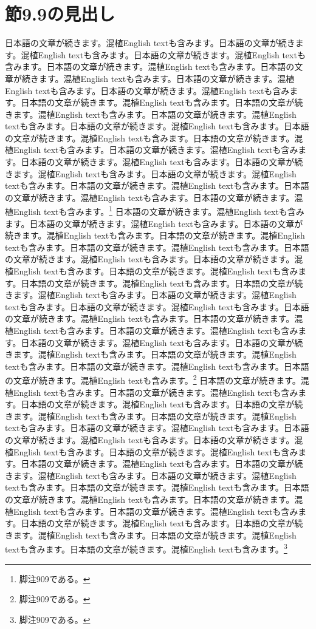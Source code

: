 \documentclass[pdflatex,book]{jlreq}
\begin{document}
\section{節9.9の見出し}
日本語の文章が続きます。混植English textも含みます。日本語の文章が続きます。混植English textも含みます。日本語の文章が続きます。混植English textも含みます。日本語の文章が続きます。混植English textも含みます。日本語の文章が続きます。混植English textも含みます。日本語の文章が続きます。混植English textも含みます。日本語の文章が続きます。混植English textも含みます。日本語の文章が続きます。混植English textも含みます。日本語の文章が続きます。混植English textも含みます。日本語の文章が続きます。混植English textも含みます。日本語の文章が続きます。混植English textも含みます。日本語の文章が続きます。混植English textも含みます。日本語の文章が続きます。混植English textも含みます。日本語の文章が続きます。混植English textも含みます。日本語の文章が続きます。混植English textも含みます。日本語の文章が続きます。混植English textも含みます。日本語の文章が続きます。混植English textも含みます。日本語の文章が続きます。混植English textも含みます。日本語の文章が続きます。混植English textも含みます。日本語の文章が続きます。混植English textも含みます。\footnote{脚注909である。}
日本語の文章が続きます。混植English textも含みます。日本語の文章が続きます。混植English textも含みます。日本語の文章が続きます。混植English textも含みます。日本語の文章が続きます。混植English textも含みます。日本語の文章が続きます。混植English textも含みます。日本語の文章が続きます。混植English textも含みます。日本語の文章が続きます。混植English textも含みます。日本語の文章が続きます。混植English textも含みます。日本語の文章が続きます。混植English textも含みます。日本語の文章が続きます。混植English textも含みます。日本語の文章が続きます。混植English textも含みます。日本語の文章が続きます。混植English textも含みます。日本語の文章が続きます。混植English textも含みます。日本語の文章が続きます。混植English textも含みます。日本語の文章が続きます。混植English textも含みます。日本語の文章が続きます。混植English textも含みます。日本語の文章が続きます。混植English textも含みます。日本語の文章が続きます。混植English textも含みます。日本語の文章が続きます。混植English textも含みます。日本語の文章が続きます。混植English textも含みます。\footnote{脚注909である。}
日本語の文章が続きます。混植English textも含みます。日本語の文章が続きます。混植English textも含みます。日本語の文章が続きます。混植English textも含みます。日本語の文章が続きます。混植English textも含みます。日本語の文章が続きます。混植English textも含みます。日本語の文章が続きます。混植English textも含みます。日本語の文章が続きます。混植English textも含みます。日本語の文章が続きます。混植English textも含みます。日本語の文章が続きます。混植English textも含みます。日本語の文章が続きます。混植English textも含みます。日本語の文章が続きます。混植English textも含みます。日本語の文章が続きます。混植English textも含みます。日本語の文章が続きます。混植English textも含みます。日本語の文章が続きます。混植English textも含みます。日本語の文章が続きます。混植English textも含みます。日本語の文章が続きます。混植English textも含みます。日本語の文章が続きます。混植English textも含みます。日本語の文章が続きます。混植English textも含みます。日本語の文章が続きます。混植English textも含みます。日本語の文章が続きます。混植English textも含みます。\footnote{脚注909である。}
\end{document}
